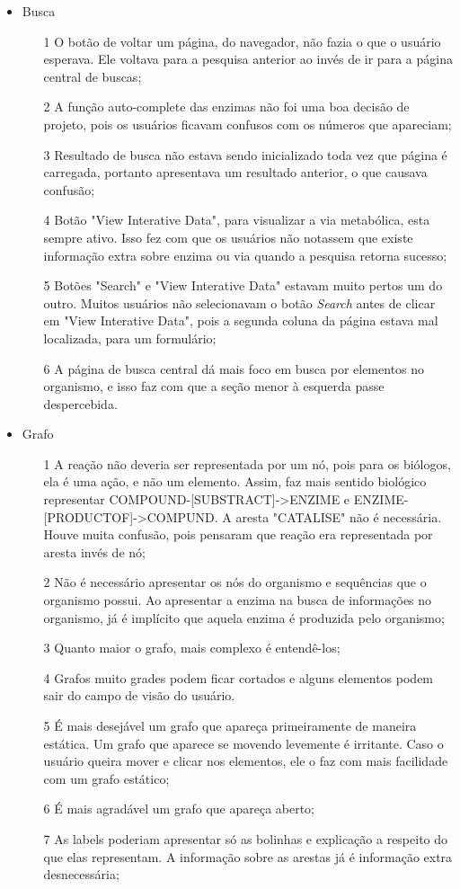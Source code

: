 \begin{itemize}
\item Busca
  \begin{itemize}
  \item[1] O botão de voltar um página, do navegador, não fazia o que o usuário esperava. Ele voltava para a pesquisa anterior ao invés de ir para a página central de buscas;
  \item[2] A função auto-complete das enzimas não foi uma boa decisão de projeto, pois os usuários ficavam confusos com os números que apareciam;
  \item[3] Resultado de busca não estava sendo inicializado toda vez que página é carregada, portanto apresentava um resultado anterior, o que causava confusão;
  \item[4] Botão "View Interative Data", para visualizar a via metabólica, esta sempre ativo. Isso fez com que os usuários não notassem que existe informação extra sobre enzima ou via quando a pesquisa retorna sucesso;
  \item[5] Botões "Search" e "View Interative Data" estavam muito pertos um do outro. Muitos usuários não selecionavam o botão \textit{Search} antes de clicar em "View Interative Data", pois a segunda coluna da página estava mal localizada, para um formulário;
  \item[6] A página de busca central dá mais foco em busca por elementos no organismo, e isso faz com que a seção menor à esquerda passe despercebida.
  \end{itemize}

\item Grafo
  \begin{itemize}
  \item[1] A reação não deveria ser representada por um nó, pois para os biólogos, ela é uma ação, e não um elemento. Assim, faz mais sentido biológico representar COMPOUND-[SUBSTRACT]->ENZIME e ENZIME-[PRODUCTOF]->COMPUND. A aresta "CATALISE" não é necessária. Houve muita confusão, pois pensaram que reação era representada por aresta invés de nó;
  \item[2] Não é necessário apresentar os nós do organismo e sequências que o organismo possui. Ao apresentar a enzima na busca de informações no organismo, já é implícito que aquela enzima é produzida pelo organismo;
  \item[3] Quanto maior o grafo, mais complexo é entendê-los;
  \item[4] Grafos muito grades podem ficar cortados e alguns elementos podem sair do campo de visão do usuário.
  \item[5] É mais desejável um grafo que apareça primeiramente de maneira estática. Um grafo que aparece se movendo levemente é irritante. Caso o usuário queira mover e clicar nos elementos, ele o faz com mais facilidade com um grafo estático;
  \item[6] É mais agradável um grafo que apareça aberto;
  \item[7] As labels poderiam apresentar só as bolinhas e explicação a respeito do que elas representam. A informação sobre as arestas já é informação extra desnecessária;
  \end{itemize}
\end{itemize}


